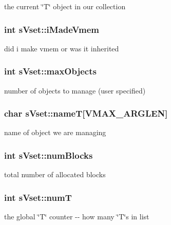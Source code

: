 the current \char`\"{}T\char`\"{} object in our collection 

\subsubsection[{iMadeVmem}]{\setlength{\rightskip}{0pt plus 5cm}int {\bf sVset::iMadeVmem}}\label{a00006_a3e514600e95b3a94ba65bd4954965b97}


did i make vmem or was it inherited 

\subsubsection[{maxObjects}]{\setlength{\rightskip}{0pt plus 5cm}int {\bf sVset::maxObjects}}\label{a00006_ae969fd9a7dc5ba70e7011267464813b8}


number of objects to manage (user specified) 

\subsubsection[{nameT}]{\setlength{\rightskip}{0pt plus 5cm}char {\bf sVset::nameT}[VMAX\_\-ARGLEN]}\label{a00006_a3c0d8879ad1e04fbeefde96afa3d6f18}


name of object we are managing 

\subsubsection[{numBlocks}]{\setlength{\rightskip}{0pt plus 5cm}int {\bf sVset::numBlocks}}\label{a00006_a7c8f23f767a2a19c9e3f25367908d73c}


total number of allocated blocks 

\subsubsection[{numT}]{\setlength{\rightskip}{0pt plus 5cm}int {\bf sVset::numT}}\label{a00006_af1009ccf64c7ca388fca7f81c4fdd003}


the global \char`\"{}T\char`\"{} counter -\/-\/ how many \char`\"{}T\char`\"{}s in list 

